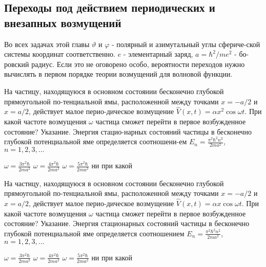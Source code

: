 \documentclass[11pt,a4paper]{exam}
\begin{document}
\subsection{ Переходы под действием периодических и внезапных возмущений }

Во всех задачах этой главы $\vartheta $ и $\varphi $ - полярный и азимутальный углы сфериче-ской системы координат соответственно. $e$ - элементарный заряд, $a = {\hbar ^2}/m{e^2}$ - бо-ровский радиус. Если это не оговорено особо, вероятности переходов нужно вычислять в первом порядке теории возмущений для волновой функции.

\begin{questions}

\question На частицу, находящуюся в основном состоянии бесконечно глубокой прямоугольной по-тенциальной ямы, расположенной между точками $x =  - a/2$ и $x = a/2$, действует малое перио-дическое возмущение $\hat V(x,t) = \alpha {x^2}\cos \omega t$. При какой частоте возмущения $\omega $ частица сможет перейти в первое возбужденное состояние? Указание. Энергия стацио-нарных состояний частицы в бесконечно глубокой потенциальной яме определяется соотношени-ем ${E_n} = \frac{{{\pi ^2}{\hbar ^2}{n^2}}}{{2m{a^2}}}$, $n = 1,2,3,...$
\begin{choices}
\choice $\omega  = \frac{{3{\pi ^2}\hbar }}{{2m{a^2}}}$    
\choice $\omega  = \frac{{4{\pi ^2}\hbar }}{{2m{a^2}}}$    
\choice $\omega  = \frac{{5{\pi ^2}\hbar }}{{2m{a^2}}}$    
\choice ни при какой
\end{choices}

\question На частицу, находящуюся в основном состоянии бесконечно глубокой прямоугольной по-тенциальной ямы, расположенной между точками $x =  - a/2$ и $x = a/2$, действует малое перио-дическое возмущение $\hat V(x,t) = \alpha x\cos \omega t$. При какой частоте возмущения $\omega $ частица сможет перейти в первое возбужденное состояние? Указание. Энергия стационарных состояний частицы в бесконечно глубокой потенциальной яме определяется соотношением ${E_n} = \frac{{{\pi ^2}{\hbar ^2}{n^2}}}{{2m{a^2}}}$, $n = 1,2,3,...$
\begin{choices}
\choice $\omega  = \frac{{3{\pi ^2}\hbar }}{{2m{a^2}}}$    
\choice $\omega  = \frac{{4{\pi ^2}\hbar }}{{2m{a^2}}}$    
\choice $\omega  = \frac{{5{\pi ^2}\hbar }}{{2m{a^2}}}$    
\choice ни при какой
\end{choices}


\end{questions}
\end{document}
